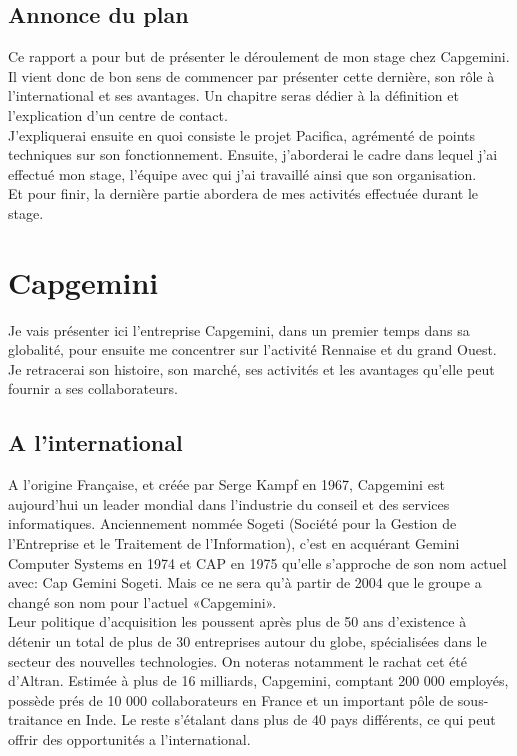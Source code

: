 \documentclass{rapport}
\begin{document}
\subsection*{Annonce du plan}

Ce rapport a pour but de présenter le déroulement de mon stage chez Capgemini. Il vient donc de bon sens de commencer par présenter cette dernière, son rôle à l'international et ses avantages.
Un chapitre seras dédier à la définition et l'explication d'un centre de contact.\\
J'expliquerai ensuite en quoi consiste le projet Pacifica, agrémenté de points techniques sur son fonctionnement.
Ensuite, j'aborderai le cadre dans lequel j'ai effectué mon stage, l'équipe avec qui j'ai travaillé ainsi que son organisation.\\
Et pour finir, la dernière partie abordera de mes activités effectuée durant le stage.

\newpage

\section{Capgemini}

Je vais présenter ici l'entreprise Capgemini, dans un premier temps dans sa globalité, pour ensuite me concentrer sur l’activité Rennaise et du grand Ouest. Je retracerai son histoire, son marché, ses activités et les avantages qu'elle peut fournir a ses collaborateurs.

\subsection{A l'international}

A l'origine Française, et créée par Serge Kampf en 1967, Capgemini est aujourd'hui un leader mondial dans l'industrie du conseil et des services informatiques. Anciennement nommée Sogeti (Société pour la Gestion de l'Entreprise et le Traitement de l'Information), c'est en acquérant Gemini Computer Systems en 1974 et CAP en 1975 qu'elle s'approche de son nom actuel avec: Cap Gemini Sogeti. Mais ce ne sera qu'à partir de 2004 que le groupe a changé son nom pour l'actuel «Capgemini».\\

Leur politique d'acquisition les poussent après plus de 50 ans d'existence à détenir un total de plus de 30 entreprises autour du globe, spécialisées dans le secteur des nouvelles technologies. On noteras notamment le rachat cet été d'Altran.
Estimée à plus de 16 milliards, Capgemini, comptant 200 000 employés, possède prés de 10 000 collaborateurs en France et un important pôle de sous-traitance en Inde. Le reste s’étalant dans plus de 40 pays différents, ce qui peut offrir des opportunités a l'international.
\end{document}

